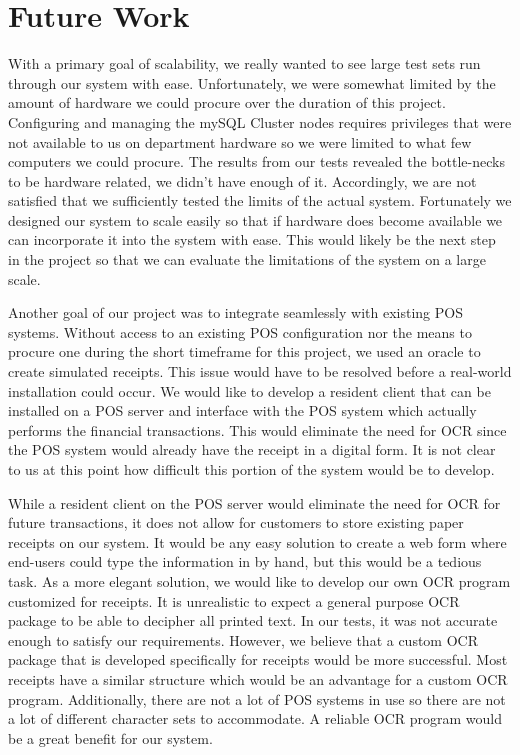\section{Future Work}
\label{sec:future}

With a primary goal of scalability, we really wanted to see large test sets run through our system with ease.  Unfortunately, we were somewhat limited by the amount of hardware we could procure over the duration of this project.  Configuring and managing the mySQL Cluster nodes requires privileges that were not available to us on department hardware so we were limited to what few computers we could procure.  The results from our tests revealed the bottle-necks to be hardware related, we didn't have enough of it.  Accordingly, we are not satisfied that we sufficiently tested the limits of the actual system.  Fortunately we designed our system to scale easily so that if hardware does become available we can incorporate it into the system with ease.  This would likely be the next step in the project so that we can evaluate the limitations of the system on a large scale.

Another goal of our project was to integrate seamlessly with existing POS systems.  Without access to an existing POS configuration nor the means to procure one during the short timeframe for this project, we used an oracle to create simulated receipts.  This issue would have to be resolved before a real-world installation could occur.  We would like to develop a resident client that can be installed on a POS server and interface with the POS system which actually performs the financial transactions.  This would eliminate the need for OCR since the POS system would already have the receipt in a digital form.  It is not clear to us at this point how difficult this portion of the system would be to develop.

While a resident client on the POS server would eliminate the need for OCR for future transactions, it does not allow for customers to store existing paper receipts on our system.  It would be any easy solution to create a web form where end-users could type the information in by hand, but this would be a tedious task.  As a more elegant solution, we would like to develop our own OCR program customized for receipts.  It is unrealistic to expect a general purpose OCR package to be able to decipher all printed text.  In our tests, it was not accurate enough to satisfy our requirements.  However, we believe that a custom OCR package that is developed specifically for receipts would be more successful.  Most receipts have a similar structure which would be an advantage for a custom OCR program.  Additionally, there are not a lot of POS systems in use so there are not a lot of different character sets to accommodate.  A reliable OCR program would be a great benefit for our system.
